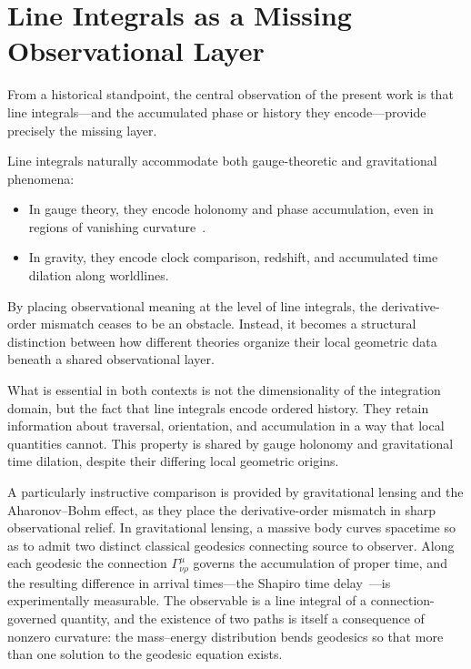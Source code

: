 \documentclass[12pt,letterpaper]{article}
\begin{document}
\section{Line Integrals as a Missing Observational Layer}

\justifying
From a historical standpoint, the central observation of the present work is that line integrals---and the accumulated phase or history they encode---provide precisely the missing layer.

Line integrals naturally accommodate both gauge-theoretic and gravitational phenomena:
\begin{itemize}
\item In gauge theory, they encode holonomy and phase accumulation, even in regions of vanishing curvature~\cite{AharonovBohm1959}.
\item In gravity, they encode clock comparison, redshift, and accumulated time dilation along worldlines.
\end{itemize}

By placing observational meaning at the level of line integrals, the derivative-order mismatch ceases to be an obstacle. Instead, it becomes a structural distinction between how different theories organize their local geometric data beneath a shared observational layer.

What is essential in both contexts is not the dimensionality of the integration domain, but the fact that line integrals encode ordered history. They retain information about traversal, orientation, and accumulation in a way that local quantities cannot. This property is shared by gauge holonomy and gravitational time dilation, despite their differing local geometric origins.

A particularly instructive comparison is provided by gravitational lensing and the Aharonov--Bohm effect, as they place the derivative-order mismatch in sharp observational relief. In gravitational lensing, a massive body curves spacetime so as to admit two distinct classical geodesics connecting source to observer. Along each geodesic the connection $\Gamma^\mu_{\nu\rho}$ governs the accumulation of proper time, and the resulting difference in arrival times---the Shapiro time delay~\cite{Shapiro1964}---is experimentally measurable. The observable is a line integral of a connection-governed quantity, and the existence of two paths is itself a consequence of nonzero curvature: the mass--energy distribution bends geodesics so that more than one solution to the geodesic equation exists.
\end{document}
